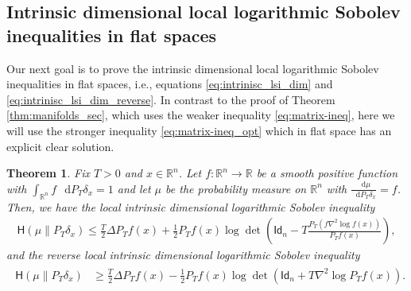 \documentclass[a4paper,twoside,11pt,reqno]{amsart}
\newtheorem{theorem}{Theorem}
\newcommand*\diff{\mathop{}\!\mathrm{d}}
\newcommand{\R}{\mathbb{R}} %
\newcommand{\msf}{\mathsf}
\newcommand{\HH}{\mathsf{H}}
\begin{document}
\subsection{Intrinsic dimensional local logarithmic Sobolev inequalities in flat spaces}
\label{subsec:intrinsic_LIS_flat}
Our next goal is to prove the intrinsic dimensional local logarithmic Sobolev inequalities in flat spaces, i.e., equations \eqref{eq:intrinisc_lsi_dim} and \eqref{eq:intrinisc_lsi_dim_reverse}. In contrast to the proof of Theorem \ref{thm:manifolds_sec}, which uses the weaker inequality \eqref{eq:matrix-ineq}, here we will use the stronger inequality \eqref{eq:matrix-ineq_opt} which in flat space has an explicit clear solution. 
\begin{theorem}
\label{thm:flat}
Fix $T>0$ and $x\in\R^n$. Let $f:\R^n\to\R$ be a smooth positive function with $\int_{\R^n} f\,\diff P_T\delta_x = 1$ and let $\mu$ be the probability measure on $\R^n$ with $\tfrac{\diff\mu}{\diff P_T\delta_x}=f$. Then, we have the local intrinsic dimensional logarithmic Sobolev inequality
\begin{align}
\label{eq:intrinisc_lsi_dim_thm}
\HH(\mu \| P_T\delta_x) \leq \frac{T}{2} \Delta P_Tf (x)+\frac{1}{2}P_Tf(x)\log\det\left(\msf{Id}_n -T\frac{P_T(f\nabla^2\log f(x))}{P_Tf(x)}\right),
\end{align}
and the reverse local intrinsic dimensional logarithmic Sobolev inequality
\begin{align}
\label{eq:intrinisc_lsi_dim_reverse_thm}
\begin{split}
\HH(\mu \| P_T\delta_x) &\geq \frac{T}{2}\Delta P_Tf(x) -\frac{1}{2}P_Tf(x)\log\det\left(\msf{Id}_n+T\nabla^2\log P_Tf(x)\right).
\end{split}
\end{align}
\end{theorem}
\end{document}
